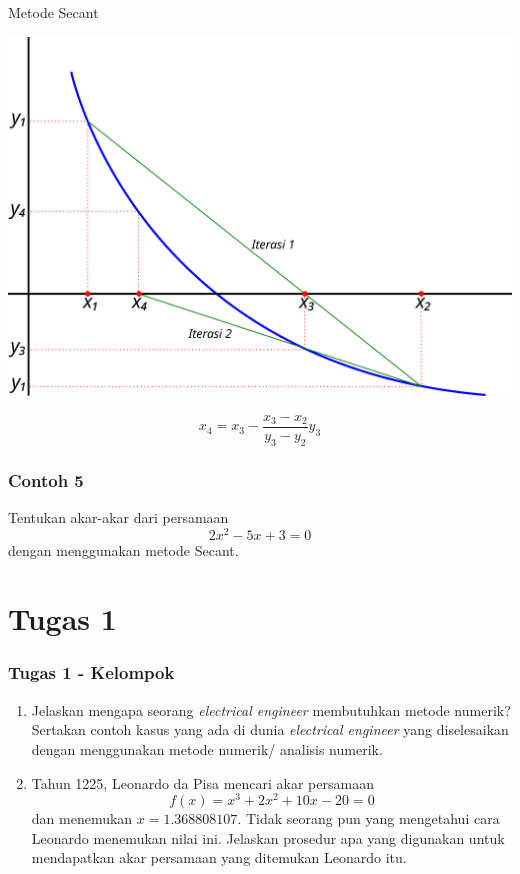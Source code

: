 \documentclass[pdflatex,compress]{beamer}
\begin{document}
\begin{frame}{Metode Secant}
	\begin{center}
		\includegraphics[width=0.7\linewidth]{img/05}
	\end{center}
	$$ x_4 = x_{3} - \frac{x_{3}-x_{2}}{y_{3}-y_{2}}y_{3} $$
\end{frame}

\begin{frame}
	\frametitle{Contoh 5}
	Tentukan akar-akar dari persamaan $$ 2x^2 - 5x + 3 = 0 $$ dengan menggunakan metode Secant.
\end{frame}

\section{Tugas 1}

\begin{frame}
	\frametitle{Tugas 1 - Kelompok}
	\begin{enumerate}
		\item Jelaskan mengapa seorang \textit{electrical engineer} membutuhkan metode numerik? Sertakan contoh kasus yang ada di dunia \textit{electrical engineer} yang diselesaikan dengan menggunakan metode numerik/ analisis numerik.
		\item Tahun 1225, Leonardo da Pisa mencari akar persamaan
		$$ f(x) = x^3 + 2x^2 + 10x - 20 = 0 $$
		dan menemukan $ x = 1.368808107 $. Tidak seorang pun yang mengetahui cara
		Leonardo menemukan nilai ini. Jelaskan prosedur apa yang digunakan untuk mendapatkan  akar persamaan yang ditemukan Leonardo itu.
	\end{enumerate}
\end{frame}
\end{document}
